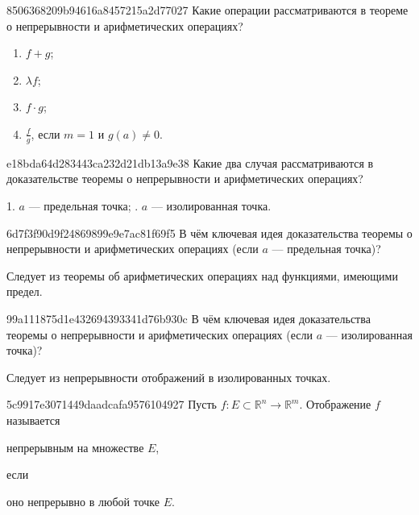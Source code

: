 \begin{note}{8506368209b94616a8457215a2d77027}
    Какие операции рассматриваются в теореме о непрерывности и арифметических операциях?

    \begin{cloze}{1}
        \begin{enumerate}
            \item \({ f + g }\);
            \item \({ \lambda f }\);
            \item \({ f \cdot g }\);
            \item \({ \frac{f}{g} }\), если \({ m = 1 }\) и \({ g (a) \neq 0 }\).
        \end{enumerate}
    \end{cloze}
\end{note}

\begin{note}{e18bda64d283443ca232d21db13a9e38}
    Какие два случая рассматриваются в доказательстве теоремы о непрерывности и арифметических операциях?

    \begin{cloze}{1}
        1. \({ a }\) --- предельная точка; . \({ a }\) --- изолированная точка.
    \end{cloze}
\end{note}

\begin{note}{6d7f3f90d9f24869899e9e7ac81f69f5}
    В чём ключевая идея доказательства теоремы о непрерывности и арифметических операциях (если \({ a }\) --- предельная точка)?

    \begin{cloze}{1}
        Следует из теоремы об арифметических операциях над функциями, имеющими предел.
    \end{cloze}
\end{note}

\begin{note}{99a111875d1e432694393341d76b930c}
    В чём ключевая идея доказательства теоремы о непрерывности и арифметических операциях (если \({ a }\) --- изолированная точка)?

    \begin{cloze}{1}
        Следует из непрерывности отображений в изолированных точках.
    \end{cloze}
\end{note}

\begin{note}{5c9917e3071449daadcafa9576104927}
    Пусть \({ f : E \subset \mathbb R^{n} \to \mathbb R^{m} }\). Отображение \({ f }\) называется \begin{icloze}{2}непрерывным на множестве \({ E }\),\end{icloze} если \begin{icloze}{1}оно непрерывно в любой точке \({ E }\).\end{icloze}
\end{note}

